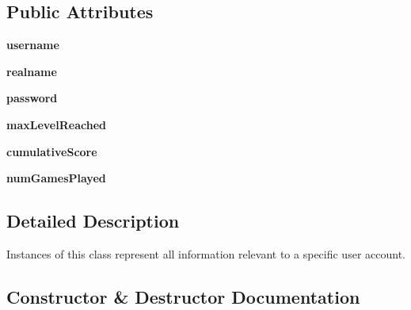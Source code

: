 \subsection*{Public Attributes}
\begin{DoxyCompactItemize}
\item 
\hypertarget{classsrc_1_1models_1_1_user_account_a324ce15e04522bc6d7e1b1518f7a9810}{}{\bfseries username}\label{classsrc_1_1models_1_1_user_account_a324ce15e04522bc6d7e1b1518f7a9810}

\item 
\hypertarget{classsrc_1_1models_1_1_user_account_a0fce5f371818dfb89c6837313497dbb5}{}{\bfseries realname}\label{classsrc_1_1models_1_1_user_account_a0fce5f371818dfb89c6837313497dbb5}

\item 
\hypertarget{classsrc_1_1models_1_1_user_account_a94b6fb51043b9cd72661f232aac24168}{}{\bfseries password}\label{classsrc_1_1models_1_1_user_account_a94b6fb51043b9cd72661f232aac24168}

\item 
\hypertarget{classsrc_1_1models_1_1_user_account_ac3bcbebd2526795af0c1be70b8100434}{}{\bfseries max\+Level\+Reached}\label{classsrc_1_1models_1_1_user_account_ac3bcbebd2526795af0c1be70b8100434}

\item 
\hypertarget{classsrc_1_1models_1_1_user_account_aba4c0aff5e1f4aa209fef3a9d77b7bb7}{}{\bfseries cumulative\+Score}\label{classsrc_1_1models_1_1_user_account_aba4c0aff5e1f4aa209fef3a9d77b7bb7}

\item 
\hypertarget{classsrc_1_1models_1_1_user_account_adb4b6601e342d936266c44a9e809e3db}{}{\bfseries num\+Games\+Played}\label{classsrc_1_1models_1_1_user_account_adb4b6601e342d936266c44a9e809e3db}

\end{DoxyCompactItemize}


\subsection{Detailed Description}
Instances of this class represent all information relevant to a specific user account. 

\subsection{Constructor \& Destructor Documentation}
\hypertarget{classsrc_1_1models_1_1_user_account_a027838850b725021534e05b2efffdc8f}{}

